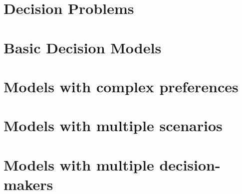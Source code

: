 \documentclass[11pt]{report}
\begin{document}
	\maketitle
	\tableofcontents
	\newpage	
	
	\part{Decision Problems}
	
	
	
	
	
	\part{Basic Decision Models}
	
	
	
	
	\part{Models with complex preferences}
	
	
	
	
	\part{Models with multiple scenarios}
	
	
	
	
	
	
	\part{Models with multiple decision-makers}
	
	
	
\end{document}
